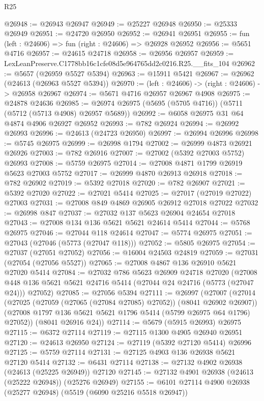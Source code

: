 \begin{lexlean}{R25}
\begin{coremodule}
@26948 := @26943 @26947
@26949 := @25227 @26948
@26950 := @25333 @26949
@26951 := @24720 @26950
@26952 := @26941 @26951
@26955 := fun (left : @24606) => fun (right : @24606) => @26928 @26952
@26956 := @5651 @4716
@26957 := @24615 @24718
@26958 := @26956 @26957
@26959 := LexLeanPreserve.C1778bb16c1cfe08d5e964765dd2c0216.R25.__fits_104
@26962 := @5657 (@26959 @5527 @5394)
@26963 := @15911 @5421
@26967 := @26962 (@24613 (@26963 @5527 @5394))
@26970 := (left : @24606) -> (right : @24606) -> @26958 @26967
@26974 := @5671 @4716 @26957 @26967 @4908
@26975 := @24878 @24636
@26985 := @26974 @26975 (@5695 (@5705 @4716)) (@5711 (@5712 (@5713 @4908) @26957 @5689))
@26992 := @6058 @26975 @31 @64 @4874 @4906 @26927 @26952
@26993 := @782 @26924
@26994 := @26992 @26993
@26996 := @24613 (@24723 @26950)
@26997 := @26994 @26996
@26998 := @5745 @26975
@26999 := @26998 @1794
@27002 := @26999 @4873 @26921 @26926
@27003 := @782 @26916
@27007 := @27002 (@5392 @27003 @5752) @26993
@27008 := @5759 @26975
@27014 := @27008 @4871 @1799 @26919 @5623 @27003 @5752
@27017 := @26999 @4870 @26913 @26918
@27018 := @782 @26902
@27019 := @5392 @27018
@27020 := @782 @26907
@27021 := @5392 @27020
@27022 := @27021 @5414
@27025 := @27017 (@27019 @27022) @27003
@27031 := @27008 @849 @4869 @26905 @26912 @27018 @27022
@27032 := @26998 @847
@27037 := @27032 @137 @5623 @26904 @24654 @27018
@27043 := @27008 @134 @136 @5621 @5621 @24614 @5414
@27044 := @5768 @26975
@27046 := @27044 @118 @24614
@27047 := @5774 @26975
@27051 := @27043 (@27046 (@5773 (@27047 @118)))
@27052 := @5805 @26975
@27054 := @27037 (@27051 @27052)
@27056 := @16004 @24503 @24819
@27059 := @27031 (@27054 (@27056 @5527))
@27065 := @27008 @4867 @136 @26910 @5621 @27020 @5414
@27084 := @27032
    @786
    @5623
    @26909
    @24718
    @27020
    (@27008 @448 @136 @5621 @5621 @24716 @5414 (@27044 @24 @24716 (@5773 (@27047 @24))) @27052)
@27085 := @27056 @5394
@27111 := @26997
    (@27007
      (@27014
        (@27025 (@27059 (@27065 (@27084 @27085) @27052)) (@8041 @26902 @26907))
        (@27008 @1797 @136 @5621 @5621 @1796 @5414 (@5799 @26975 @64 @1796) @27052))
      (@8041 @26916 @24))
@27114 := @5679 (@5915 @26993) @26975
@27115 := @6372 @27114
@27119 := @27115 @1300 @4905 @26940 @26951
@27120 := @24613 @26950
@27124 := @27119 (@5392 @27120 @5414) @26996
@27125 := @5759 @27114
@27131 := @27125 @4903 @136 @26938 @5621 @27120 @5414
@27132 := @6431 @27114
@27138 := @27132 @4902 @26938 (@24613 (@25225 @26949)) @27120
@27145 := @27132 @4901 @26938 (@24613 (@25222 @26948)) (@25276 @26949)
@27155 := @6101 @27114 @4900 @26938 (@25277 @26948) (@5519 (@6090 @25216 @5518 @26947))

\end{coremodule}
\end{lexlean}
